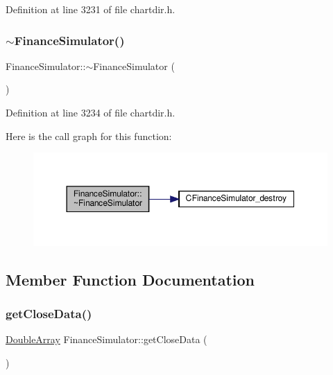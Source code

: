 Definition at line 3231 of file chartdir.\+h.

\mbox{\label{class_finance_simulator_a262287be86cd988ef6931485040ab290}} 
\subsubsection{\texorpdfstring{$\sim$\+Finance\+Simulator()}{~FinanceSimulator()}}
{\footnotesize\ttfamily Finance\+Simulator\+::$\sim$\+Finance\+Simulator (\begin{DoxyParamCaption}{ }\end{DoxyParamCaption})\hspace{0.3cm}{\ttfamily [inline]}}



Definition at line 3234 of file chartdir.\+h.

Here is the call graph for this function\+:
\nopagebreak
\begin{figure}[H]
\begin{center}
\leavevmode
\includegraphics[width=350pt]{class_finance_simulator_a262287be86cd988ef6931485040ab290_cgraph}
\end{center}
\end{figure}


\subsection{Member Function Documentation}
\mbox{\label{class_finance_simulator_a3c85f600cc321db2f07de6e79455b1d5}} 
\subsubsection{\texorpdfstring{get\+Close\+Data()}{getCloseData()}}
{\footnotesize\ttfamily \hyperlink{class_double_array}{Double\+Array} Finance\+Simulator\+::get\+Close\+Data (\begin{DoxyParamCaption}{ }\end{DoxyParamCaption})\hspace{0.3cm}{\ttfamily [inline]}}



